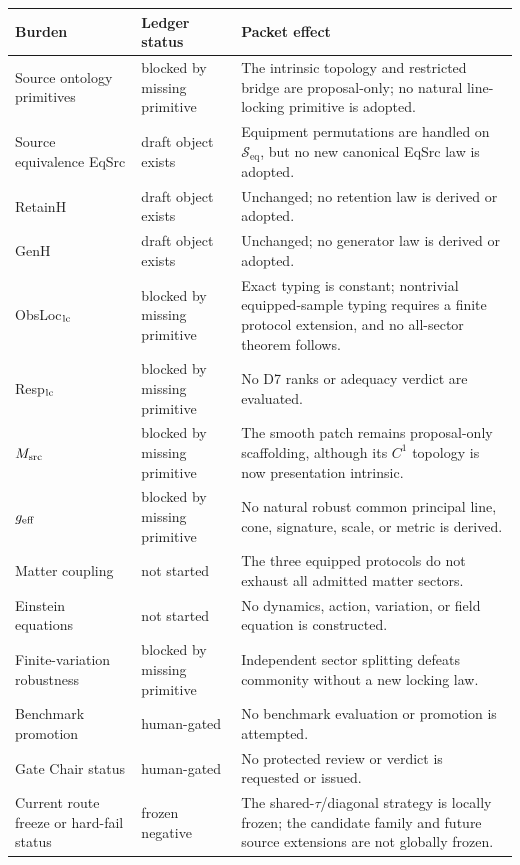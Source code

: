 \documentclass[11pt]{article}
\newcommand{\Seq}{\mathcal S_{\mathrm{eq}}}
\begin{document}
\begin{longtable}{>{\raggedright\arraybackslash}p{}>{\raggedright\arraybackslash}p{}>{\raggedright\arraybackslash}p{}}
\toprule
Burden & Ledger status & Packet effect\\
\midrule
Source ontology primitives & blocked by missing primitive & The intrinsic topology and restricted bridge are proposal-only; no natural line-locking primitive is adopted.\\
Source equivalence EqSrc & draft object exists & Equipment permutations are handled on \(\Seq\), but no new canonical EqSrc law is adopted.\\
RetainH & draft object exists & Unchanged; no retention law is derived or adopted.\\
GenH & draft object exists & Unchanged; no generator law is derived or adopted.\\
ObsLoc\(_{\rm lc}\) & blocked by missing primitive & Exact typing is constant; nontrivial equipped-sample typing requires a finite protocol extension, and no all-sector theorem follows.\\
Resp\(_{\rm lc}\) & blocked by missing primitive & No D7 ranks or adequacy verdict are evaluated.\\
\(M_{\rm src}\) & blocked by missing primitive & The smooth patch remains proposal-only scaffolding, although its \(C^1\) topology is now presentation intrinsic.\\
\(g_{\rm eff}\) & blocked by missing primitive & No natural robust common principal line, cone, signature, scale, or metric is derived.\\
Matter coupling & not started & The three equipped protocols do not exhaust all admitted matter sectors.\\
Einstein equations & not started & No dynamics, action, variation, or field equation is constructed.\\
Finite-variation robustness & blocked by missing primitive & Independent sector splitting defeats commonity without a new locking law.\\
Benchmark promotion & human-gated & No benchmark evaluation or promotion is attempted.\\
Gate Chair status & human-gated & No protected review or verdict is requested or issued.\\
Current route freeze or hard-fail status & frozen negative & The shared-\(\tau\)/diagonal strategy is locally frozen; the candidate family and future source extensions are not globally frozen.\\
\bottomrule
\end{longtable}
\end{document}
